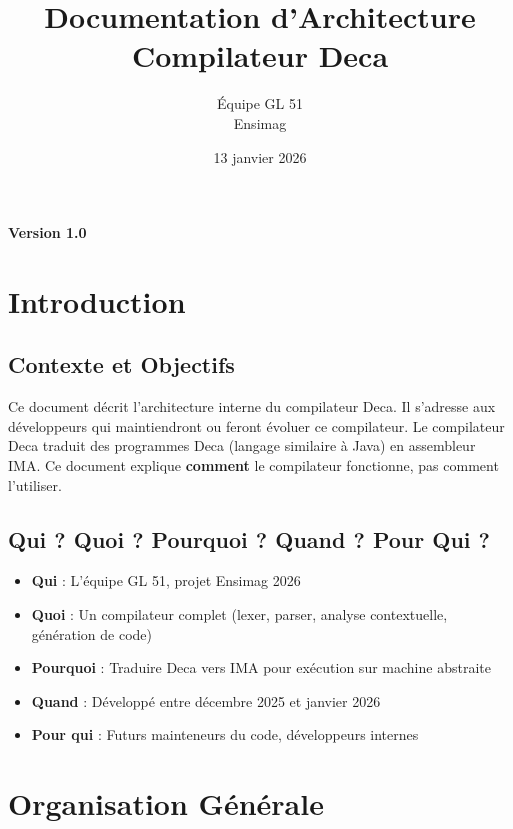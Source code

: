 \documentclass[12pt,a4paper]{article}
\title{\textbf{Documentation d'Architecture\\Compilateur Deca}}
\author{Équipe GL 51\\Ensimag}
\date{13 janvier 2026}
\begin{document}
\maketitle
\thispagestyle{empty}

\begin{center}
\vspace{2cm}
\large
\textbf{Version 1.0}
\end{center}

\newpage
\tableofcontents
\newpage

\section{Introduction}

\subsection{Contexte et Objectifs}

Ce document décrit l'architecture interne du compilateur Deca. Il s'adresse aux développeurs qui maintiendront ou feront évoluer ce compilateur. Le compilateur Deca traduit des programmes Deca (langage similaire à Java) en assembleur IMA. Ce document explique \textbf{comment} le compilateur fonctionne, pas comment l'utiliser.

\subsection{Qui ? Quoi ? Pourquoi ? Quand ? Pour Qui ?}

\begin{itemize}[itemsep=0.2em]
    \item \textbf{Qui} : L'équipe GL 51, projet Ensimag 2026
    \item \textbf{Quoi} : Un compilateur complet (lexer, parser, analyse contextuelle, génération de code)
    \item \textbf{Pourquoi} : Traduire Deca vers IMA pour exécution sur machine abstraite
    \item \textbf{Quand} : Développé entre décembre 2025 et janvier 2026
    \item \textbf{Pour qui} : Futurs mainteneurs du code, développeurs internes
\end{itemize}

\section{Organisation Générale}
\end{document}

